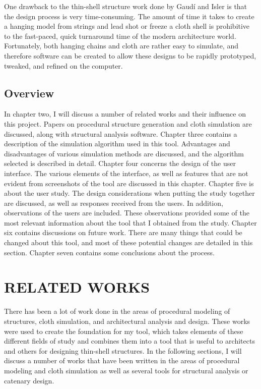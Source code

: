 \documentclass{thesis}
\begin{document}
One drawback to the thin-shell structure work done by Gaud\'{i} and Isler is that the design process is very time-consuming.  The amount of time
it takes to create a hanging model from strings and lead shot or freeze a cloth shell is prohibitive to the fast-paced, quick turnaround time of
the modern architecture world.  Fortunately, both hanging chains and cloth are rather easy to simulate, and therefore software can be created to
allow these designs to be rapidly prototyped, tweaked, and refined on the computer.

\section{Overview}
In chapter two, I will discuss a number of related works and their influence on this project.  Papers on
procedural structure generation and cloth simulation are discussed, along with structural analysis software.
Chapter three contains a description of the simulation algorithm used in this tool.  Advantages and
disadvantages of various simulation methods are discussed, and the algorithm selected is described in detail.
Chapter four concerns the design of the user interface.  The various elements of the interface, as well as
features that are not evident from screenshots of the tool are discussed in this chapter.  Chapter five is
about the user study.  The design considerations when putting the study together are discussed, as well as
responses received from the users.  In addition, observations of the users are included.  These observations
provided some of the most relevant information about the tool that I obtained from the study.  Chapter six
contains discussions on future work.  There are many things that could be changed about this tool, and most
of these potential changes are detailed in this section.  Chapter seven contains some conclusions about the
process.

\clearpage
\chapter{RELATED WORKS}
There has been a lot of work done in the areas of procedural modeling of structures, cloth simulation, and
architectural analysis and design.  These works were used to create the foundation for my tool, which takes
elements of these different fields of study and combines them into a tool that is useful to architects and
others for designing thin-shell structures.  In the following sections, I will discuss a number of works
that have been written in the areas of procedural modeling and cloth simulation as well as several tools
for structural analysis or catenary design.
\end{document}
